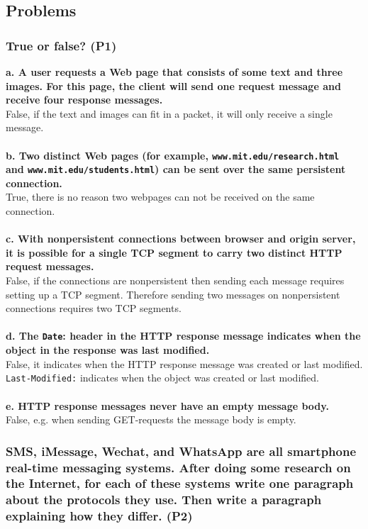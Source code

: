\subsection{Problems}



\subsubsection{True or false? (P1)}

\textbf{a. A user requests a Web page that consists of some text and three images. For this page, the client will send one request message and receive four response messages.}\\
False, if the text and images can fit in a packet, it will only receive a single message.\\
\\
\textbf{b. Two distinct Web pages (for example, \texttt{www.mit.edu/research.html} \\ and \texttt{www.mit.edu/students.html}) can be sent over the same persistent connection.} \\
True, there is no reason two webpages can not be received on the same connection. \\
\\
\textbf{c. With nonpersistent connections between browser and origin server, it is possible for a single TCP segment to carry two distinct HTTP request messages.} \\
False, if the connections are nonpersistent then sending each message requires setting up a TCP segment. Therefore sending two messages on nonpersistent connections requires two TCP segments.\\
\\
\textbf{d. The \texttt{Date}: header in the HTTP response message indicates when the object in the response was last modified.} \\
False, it indicates when the HTTP response message was created or last modified. \texttt{Last-Modified:} indicates when the object was created or last modified. \\
\\
\textbf{e. HTTP response messages never have an empty message body.} \\
False, e.g. when sending GET-requests the message body is empty.



\subsubsection{SMS, iMessage, Wechat, and WhatsApp are all smartphone real-time messaging systems. After doing some research on the Internet, for each of these systems write one paragraph about the protocols they use. Then write a paragraph explaining how they differ. (P2)}


